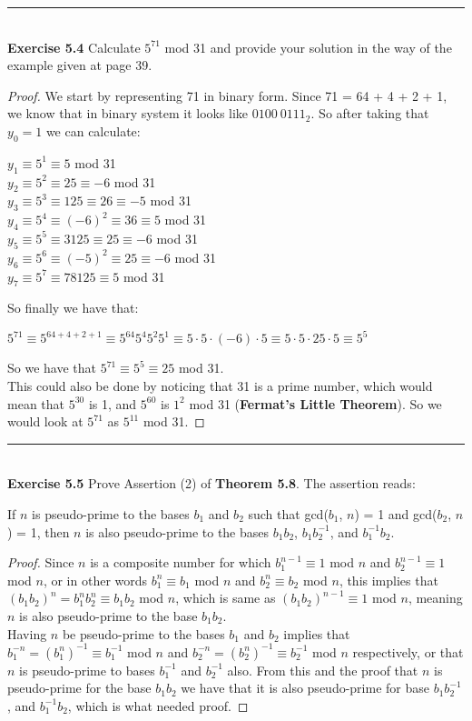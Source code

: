 \documentclass[a4paper]{article}
\begin{document}
\noindent\rule{12cm}{0.4pt}\\
\noindent \textbf{Exercise 5.4} Calculate $5^{71}$ mod 31 and provide your solution in the way of the example given at page 39.
\begin{proof}
We start by representing 71 in binary form. Since 71 = 64 + 4 + 2 + 1, we know that in binary system it looks like $0100\ 0111_{2}$. So after taking that $y_0 = 1$ we can calculate:
\begin{center}
$y_1 \equiv 5^1 \equiv 5$ mod 31\\
$y_2 \equiv 5^2 \equiv 25 \equiv -6$ mod 31\\
$y_3 \equiv 5^3 \equiv 125 \equiv 26 \equiv -5$ mod 31\\
$y_4 \equiv 5^4 \equiv (-6)^2 \equiv 36 \equiv 5$ mod 31\\
$y_5 \equiv 5^5 \equiv 3125 \equiv 25 \equiv -6$ mod 31\\
$y_6 \equiv 5^6 \equiv (-5)^2 \equiv 25 \equiv -6$ mod 31\\
$y_7 \equiv 5^7 \equiv 78125 \equiv 5$ mod 31\\
\end{center}
So finally we have that:
\begin{center}
$5^{71} \equiv 5^{64+4+2+1} \equiv 5^{64}5^{4}5^{2}5^{1} \equiv 5 \cdot 5 \cdot (-6) \cdot 5 \equiv 5 \cdot 5 \cdot 25 \cdot 5 \equiv 5^5$
\end{center}
So we have that $5^71 \equiv 5^5 \equiv 25$ mod 31.\\
This could also be done by noticing that 31 is a prime number, which would mean that $5^{30}$ is 1, and $5^{60}$ is $1^2$ mod 31 (\textbf{Fermat's Little Theorem}). So we would look at $5^{71}$ as $5^{11}$ mod 31.
\end{proof}



\noindent\rule{12cm}{0.4pt}\\
\noindent \textbf{Exercise 5.5} Prove Assertion (2) of \textbf{Theorem 5.8}. The assertion reads:
\begin{center}
If $n$ is pseudo-prime to the bases $b_1$ and $b_2$ such that gcd($b_1$, $n$) = 1 and gcd($b_2$, $n$) = 1, then $n$ is also pseudo-prime to the bases $b_{1}b_{2}$, $b_{1}b_{2}^{-1}$, and $b_{1}^{-1}b_{2}$.
\end{center}
\begin{proof}
Since $n$ is a composite number for which $b_{1}^{n-1} \equiv 1$ mod $n$ and $b_{2}^{n-1} \equiv 1$ mod $n$, or in other words $b_{1}^n \equiv b_{1}$ mod $n$ and $b_{2}^n \equiv b_{2}$ mod $n$, this implies that $(b_{1}b_{2})^n = b_{1}^{n}b_{2}^{n} \equiv b_{1}b_{2}$ mod $n$, which is same as $(b_{1}b_{2})^{n-1} \equiv 1$ mod $n$, meaning $n$ is also pseudo-prime to the base $b_{1}b_{2}$.\\
Having $n$ be pseudo-prime to the bases $b_1$ and $b_2$ implies that $b_1^{-n} = {(b_1^{n})}^{-1} \equiv b_1^{-1}$ mod $n$ and $b_2^{-n} = {(b_2^{n})}^{-1} \equiv b_2^{-1}$ mod $n$ respectively, or that $n$ is pseudo-prime to bases $b_{1}^{-1}$ and $b_{2}^{-1}$ also. From this and the proof that $n$ is pseudo-prime for the base $b_{1}b_{2}$ we have that it is also pseudo-prime for base $b_{1}b_{2}^{-1}$, and $b_{1}^{-1}b_{2}$, which is what needed proof.
\end{proof}
\end{document}
